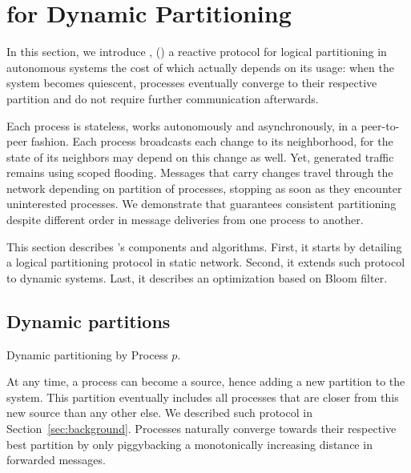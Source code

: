 
\section{\NAME for Dynamic Partitioning}
\label{sec:proposal}

In this section, we introduce \NAME, () a reactive
protocol for logical partitioning in autonomous systems the cost of
which actually depends on its usage: when the system becomes
quiescent, processes eventually converge to their respective partition
and do not require further communication afterwards.

Each process is stateless, works autonomously and asynchronously, in a
peer-to-peer fashion. Each process broadcasts each change to its
neighborhood, for the state of its neighbors may depend on this change
as well. Yet, generated traffic remains  using scoped
flooding. Messages that carry changes travel through the network
depending on partition of processes, stopping as soon as they
encounter uninterested processes. We demonstrate that \NAME guarantees
consistent partitioning despite different order in message deliveries
from one process to another.

This section describes \NAME's components and algorithms. First, it
starts by detailing a logical partitioning protocol in static
network. Second, it extends such protocol to dynamic systems. Last, it
describes an optimization based on Bloom filter. 



\subsection{Dynamic partitions}

\begin{algorithm}
  
  \caption{\label{algo:adddelundo}Dynamic partitioning by Process $p$.}
\end{algorithm}

At any time, a process can become a source, hence adding a new
partition to the system. This partition eventually includes all
processes that are closer from this new source than any other else. We
described such protocol in Section~\ref{sec:background}. Processes
naturally converge towards their respective best partition by only
piggybacking a monotonically increasing distance in forwarded
messages. %

